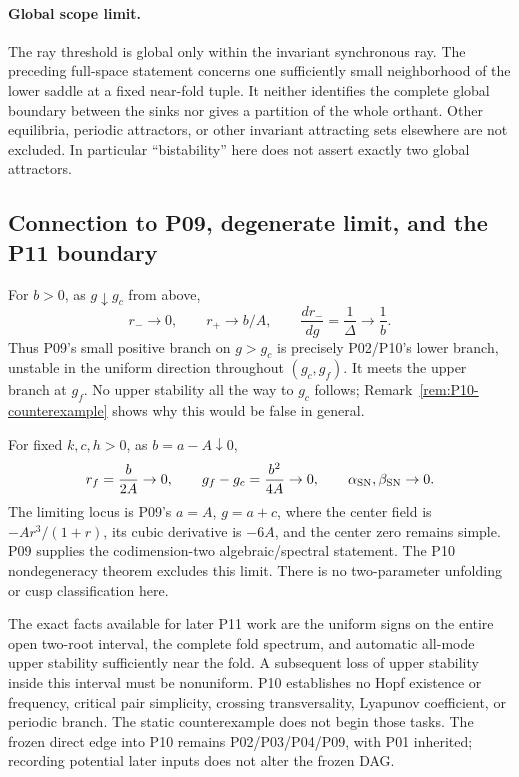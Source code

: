\documentclass[11pt]{article}
\theoremstyle{definition}
\theoremstyle{remark}
\begin{document}
\paragraph{Global scope limit.}
The ray threshold is global only within the invariant synchronous ray.
The preceding full-space statement concerns one sufficiently small
neighborhood of the lower saddle at a fixed near-fold tuple. It neither
identifies the complete global boundary between the sinks nor gives a
partition of the whole orthant. Other equilibria, periodic attractors,
or other invariant attracting sets elsewhere are not excluded. In
particular ``bistability'' here does not assert exactly two global attractors.

\subsection{Connection to P09, degenerate limit, and the P11 boundary}

For $b>0$, as $g\downarrow g_c$ from above,
\begin{equation}
 r_-\longrightarrow0,\qquad r_+\longrightarrow b/A,
 \qquad \frac{dr_-}{dg}=\frac1\Delta\longrightarrow\frac1b.
 \label{eq:P10-transcritical-connection}
\end{equation}
Thus P09's small positive branch on $g>g_c$ is precisely P02/P10's
lower branch, unstable in the uniform direction throughout
$(g_c,g_f)$. It meets the upper branch at $g_f$. No upper stability
all the way to $g_c$ follows; Remark~\ref{rem:P10-counterexample}
shows why this would be false in general.

For fixed $k,c,h>0$, as $b=a-A\downarrow0$,
\begin{equation}
 r_f=\frac b{2A}\to0,\qquad g_f-g_c=\frac{b^2}{4A}\to0,
 \qquad \alpha_{\rm SN},\beta_{\rm SN}\to0.
 \label{eq:P10-degenerate-limit}
\end{equation}
The limiting locus is P09's $a=A$, $g=a+c$, where the center field
is $-Ar^3/(1+r)$, its cubic derivative is $-6A$, and the center
zero remains simple. P09 supplies the codimension-two algebraic/spectral
statement. The P10 nondegeneracy theorem excludes this limit.
There is no two-parameter unfolding or cusp classification here.

The exact facts available for later P11 work are the uniform signs
on the entire open two-root interval, the complete fold spectrum,
and automatic all-mode upper stability sufficiently near the fold.
A subsequent loss of upper stability inside this interval must be
nonuniform. P10 establishes no Hopf existence or frequency, critical
pair simplicity, crossing transversality, Lyapunov coefficient, or
periodic branch. The static counterexample does not begin those tasks.
The frozen direct edge into P10 remains P02/P03/P04/P09, with P01
inherited; recording potential later inputs does not alter the frozen DAG.
\end{document}
